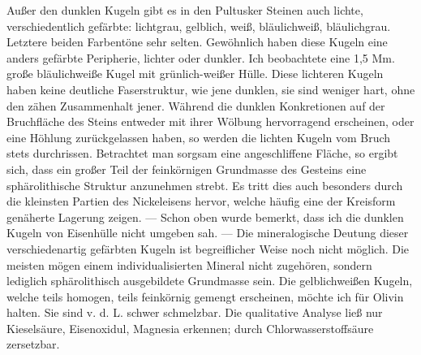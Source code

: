 \documentclass[a4paper, 11pt, oneside, german]{article}
\begin{document}
Außer den dunklen Kugeln gibt es in den Pultusker Steinen auch lichte, verschiedentlich gefärbte: lichtgrau, gelblich, weiß, bläulichweiß, bläulichgrau. Letztere beiden Farbentöne sehr selten. Gewöhnlich haben diese Kugeln eine anders gefärbte Peripherie, lichter oder dunkler. Ich beobachtete eine 1,5 Mm. große bläulichweiße Kugel mit grünlich-weißer Hülle. Diese lichteren Kugeln haben keine deutliche Faserstruktur, wie jene dunklen, sie sind weniger hart, ohne den zähen Zusammenhalt jener. Während die dunklen Konkretionen auf der Bruchfläche des Steins entweder mit ihrer Wölbung hervorragend erscheinen, oder eine Höhlung zurückgelassen haben, so werden die lichten Kugeln vom Bruch stets durchrissen. Betrachtet man sorgsam eine angeschliffene Fläche, so ergibt sich, dass ein großer Teil der feinkörnigen Grundmasse des Gesteins eine sphärolithische Struktur anzunehmen strebt. Es tritt dies auch besonders durch die kleinsten Partien des Nickeleisens hervor, welche häufig eine der Kreisform genäherte Lagerung zeigen. --- Schon oben wurde bemerkt, dass ich die dunklen Kugeln von Eisenhülle nicht umgeben sah. --- Die mineralogische Deutung dieser verschiedenartig gefärbten Kugeln ist begreiflicher Weise noch nicht möglich. Die meisten mögen einem individualisierten Mineral nicht zugehören, sondern lediglich sphärolithisch ausgebildete Grundmasse sein. Die gelblichweißen Kugeln, welche teils homogen, teils feinkörnig gemengt erscheinen, möchte ich für Olivin halten. Sie sind v. d. L. schwer schmelzbar. Die qualitative Analyse ließ nur Kieselsäure, Eisenoxidul, Magnesia erkennen; durch Chlorwasserstoffsäure zersetzbar.
\end{document}
